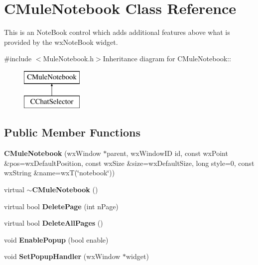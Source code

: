 \section{CMuleNotebook Class Reference}
\label{classCMuleNotebook}


This is an NoteBook control which adds additional features above what is provided by the wxNoteBook widget.  


{\ttfamily \#include $<$MuleNotebook.h$>$}Inheritance diagram for CMuleNotebook::\begin{figure}[H]
\begin{center}
\leavevmode
\includegraphics[height=2cm]{classCMuleNotebook}
\end{center}
\end{figure}
\subsection*{Public Member Functions}
\begin{DoxyCompactItemize}
\item 
{\bf CMuleNotebook} (wxWindow $\ast$parent, wxWindowID id, const wxPoint \&pos=wxDefaultPosition, const wxSize \&size=wxDefaultSize, long style=0, const wxString \&name=wxT(\char`\"{}notebook\char`\"{}))
\item 
virtual {\bf $\sim$CMuleNotebook} ()\label{classCMuleNotebook_a7e25a574019813f874b4d487287ce10d}

\item 
virtual bool {\bf DeletePage} (int nPage)
\item 
virtual bool {\bf DeleteAllPages} ()\label{classCMuleNotebook_a19fb1788194a63d4648e1063662798e9}

\item 
void {\bf EnablePopup} (bool enable)
\item 
void {\bf SetPopupHandler} (wxWindow $\ast$widget)
\end{DoxyCompactItemize}
